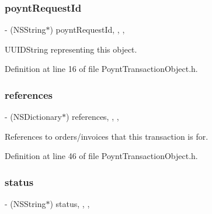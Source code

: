 \subsubsection{\texorpdfstring{poynt\+Request\+Id}{poyntRequestId}}
{\footnotesize\ttfamily -\/ (N\+S\+String$\ast$) poynt\+Request\+Id\hspace{0.3cm}{\ttfamily [read]}, {\ttfamily [write]}, {\ttfamily [nonatomic]}, {\ttfamily [copy]}}



U\+U\+I\+D\+String representing this object. 



Definition at line 16 of file Poynt\+Transaction\+Object.\+h.

\hypertarget{interface_poynt_transaction_object_a2bdc3d5a4da018a352f33b946a0ea384}{}\label{interface_poynt_transaction_object_a2bdc3d5a4da018a352f33b946a0ea384} 
\subsubsection{\texorpdfstring{references}{references}}
{\footnotesize\ttfamily -\/ (N\+S\+Dictionary$\ast$) references\hspace{0.3cm}{\ttfamily [read]}, {\ttfamily [write]}, {\ttfamily [nonatomic]}, {\ttfamily [strong]}}



References to orders/invoices that this transaction is for. 



Definition at line 46 of file Poynt\+Transaction\+Object.\+h.

\hypertarget{interface_poynt_transaction_object_ac2acf327011ce6ed9e26a41ceddaee31}{}\label{interface_poynt_transaction_object_ac2acf327011ce6ed9e26a41ceddaee31} 
\subsubsection{\texorpdfstring{status}{status}}
{\footnotesize\ttfamily -\/ (N\+S\+String$\ast$) status\hspace{0.3cm}{\ttfamily [read]}, {\ttfamily [write]}, {\ttfamily [nonatomic]}, {\ttfamily [copy]}}



